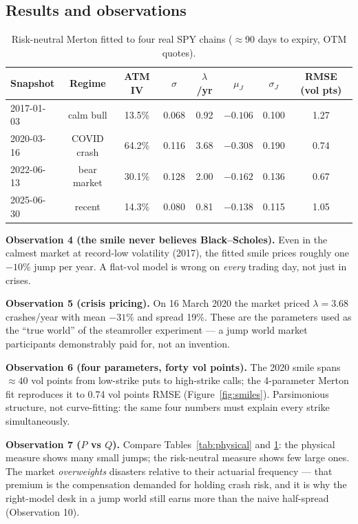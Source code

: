 \documentclass[11pt,a4paper]{article}
\begin{document}
\subsection{Results and observations}
\label{sec:rnobs}

\begin{table}[h]
\centering\small
\caption{Risk-neutral Merton fitted to four real SPY chains ($\approx$90 days
to expiry, OTM quotes).}
\label{tab:rn}
\begin{tabular}{lccccccc}
\toprule
Snapshot & Regime & ATM IV & $\sigma$ & $\lambda$/yr & $\mu_J$ & $\sigma_J$ &
RMSE (vol pts)\\
\midrule
2017-01-03 & calm bull & 13.5\% & 0.068 & 0.92 & $-0.106$ & 0.100 & 1.27\\
2020-03-16 & COVID crash & 64.2\% & 0.116 & 3.68 & $-0.308$ & 0.190 & 0.74\\
2022-06-13 & bear market & 30.1\% & 0.128 & 2.00 & $-0.162$ & 0.136 & 0.67\\
2025-06-30 & recent & 14.3\% & 0.080 & 0.81 & $-0.138$ & 0.115 & 1.05\\
\bottomrule
\end{tabular}
\end{table}

\begin{obsbox}
\textbf{Observation 4 (the smile never believes Black--Scholes).} Even in the
calmest market at record-low volatility (2017), the fitted smile prices
roughly one $-10\%$ jump per year. A flat-vol model is wrong on \emph{every}
trading day, not just in crises.

\textbf{Observation 5 (crisis pricing).} On 16 March 2020 the market priced
$\lambda=3.68$ crashes/year with mean $-31\%$ and spread 19\%. These are the
parameters used as the ``true world'' of the steamroller experiment --- a jump
world market participants demonstrably paid for, not an invention.

\textbf{Observation 6 (four parameters, forty vol points).} The 2020 smile
spans $\approx40$ vol points from low-strike puts to high-strike calls; the
4-parameter Merton fit reproduces it to 0.74 vol points RMSE
(Figure~\ref{fig:smiles}). Parsimonious structure, not curve-fitting: the same
four numbers must explain every strike simultaneously.

\textbf{Observation 7 ($P$ vs $Q$).} Compare Tables~\ref{tab:physical} and
\ref{tab:rn}: the physical measure shows many small jumps; the risk-neutral
measure shows few large ones. The market \emph{overweights} disasters relative
to their actuarial frequency --- that premium is the compensation demanded for
holding crash risk, and it is why the right-model desk in a jump world still
earns more than the naive half-spread (Observation 10).
\end{obsbox}
\end{document}
